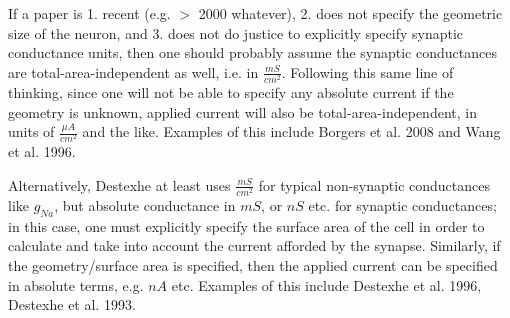 \documentclass[letterpaper,onecolumn]{article}
\begin{document}
\indent If a paper is 1. recent (e.g. $>$ 2000 whatever), 2. does not specify the geometric size of the neuron, and 3. does not do justice to explicitly specify synaptic conductance units, then one should probably assume the synaptic conductances are total-area-independent as well, i.e. in $\frac{mS}{cm^2}$.
Following this same line of thinking, since one will not be able to specify any absolute current if the geometry is unknown, applied current will also be total-area-independent, in units of $\frac{\mu A}{cm^2}$ and the like.
Examples of this include Borgers et al. 2008 and Wang et al. 1996.

\indent Alternatively, Destexhe at least uses $\frac{mS}{cm^2}$ for typical non-synaptic conductances like $g_{Na}$, but absolute conductance in $mS$, or $nS$ etc. for synaptic conductances; in this case, one must explicitly specify the surface area of the cell in order to calculate and take into account the current afforded by the synapse.
Similarly, if the geometry/surface area is specified, then the applied current can be specified in absolute terms, e.g. $nA$ etc.
Examples of this include Destexhe et al. 1996, Destexhe et al. 1993.
\end{document}
